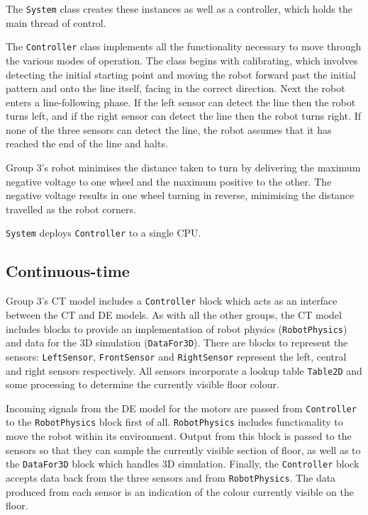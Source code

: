 The \texttt{System} class creates these instances as well as a
controller, which holds the main thread of control.  

The \texttt{Controller} class implements all the functionality
necessary to move through the various modes of operation.  The class
begins with calibrating, which involves detecting the initial starting
point and moving the robot forward past the initial pattern and onto
the line itself, facing in the correct direction.  Next the robot
enters a line-following phase.  If the left sensor can detect the line
then the robot turns left, and if the right sensor can detect the line
then the robot turns right.  If none of the three sensors can detect
the line, the robot assumes that it has reached the end of the line
and halts.

Group 3's robot minimises the distance taken to turn by delivering the
maximum negative voltage to one wheel and the maximum positive to the
other.  The negative voltage results in one wheel turning in reverse,
minimising the distance travelled as the robot corners.

\texttt{System} deploys \texttt{Controller} to a single CPU.

\subsection{Continuous-time} 
Group 3's CT model includes a \texttt{Controller} block which acts as
an interface between the CT and DE models.  As with all the other
groups, the CT model includes blocks to provide an implementation of
robot physics (\texttt{RobotPhysics}) and data for the 3D simulation
(\texttt{DataFor3D}).  There are blocks to represent the sensors:
\texttt{LeftSensor}, \texttt{FrontSensor} and \texttt{RightSensor}
represent the left, central and right sensors respectively.  All
sensors incorporate a lookup table \texttt{Table2D} and some
processing to determine the currently visible floor colour.

Incoming signals from the DE model for the motors are passed from
\texttt{Controller} to the \texttt{RobotPhysics} block first of all.
\texttt{RobotPhysics} includes functionality to move the robot within
its environment.  Output from this block is passed to the sensors so
that they can sample the currently visible section of floor, as well
as to the \texttt{DataFor3D} block which handles 3D simulation.
Finally, the \texttt{Controller} block accepts data back from the
three sensors and from \texttt{RobotPhysics}.  The data produced from
each sensor is an indication of the colour currently visible on the
floor.










